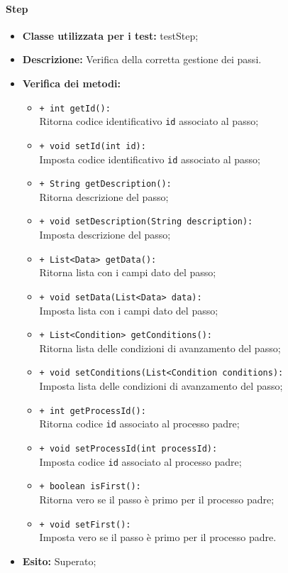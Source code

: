 \paragraph{Step}
\begin{flushleft}
\begin{itemize}
\item \textbf{Classe utilizzata per i test:} testStep;
\item \textbf{Descrizione:} Verifica della corretta gestione dei passi.
\item \textbf{Verifica dei metodi:}
\begin{sloppypar}
\begin{itemize}
\item \texttt{+ int getId():}\\ Ritorna codice identificativo \texttt{id} associato al passo;
\item \texttt{+ void setId(int id):}\\ Imposta codice identificativo \texttt{id} associato al passo;
\item \texttt{+ String getDescription():}\\ Ritorna descrizione del passo;
\item \texttt{+ void setDescription(String description):}\\ Imposta descrizione del passo;
\item \texttt{+ List<Data> getData():}\\ Ritorna lista con i campi dato del passo;
\item \texttt{+ void setData(List<Data> data):}\\ Imposta lista con i campi dato del passo;
\item \texttt{+ List<Condition> getConditions():}\\ Ritorna lista delle condizioni di avanzamento del passo;
\item \texttt{+ void setConditions(List<Condition conditions):}\\ Imposta lista delle condizioni di avanzamento del passo;
\item \texttt{+ int getProcessId():}\\ Ritorna codice \texttt{id} associato al processo padre;
\item \texttt{+ void setProcessId(int processId):}\\ Imposta codice \texttt{id} associato al processo padre;
\item \texttt{+ boolean isFirst():}\\ Ritorna vero se il passo è primo per il processo padre;
\item \texttt{+ void setFirst():}\\ Imposta vero se il passo è primo per il processo padre. 
\end{itemize}
\end{sloppypar}
\item \textbf{Esito:} Superato;
\end{itemize}
\end{flushleft}

